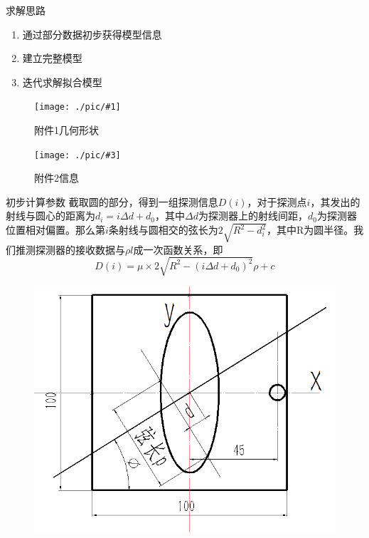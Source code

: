 \documentclass{beamer}
\newcommand{\doublepic}[4]{ \begin{figure}[H]
\begin{minipage}[H]{0.45\textwidth}
\centering
\texttt{[image: ./pic/\#1]}
\caption{#2}
\end{minipage}
\begin{minipage}[H]{0.45\textwidth}
\centering
\texttt{[image: ./pic/\#3]}
\caption{#4}
\end{minipage}
\end{figure}}
\begin{document}
\begin{frame}{求解思路}
	\begin{enumerate}
		\item 通过部分数据初步获得模型信息
		\item 建立完整模型
		\item 迭代求解拟合模型
	\end{enumerate}
	\doublepic{fujian1.png}{附件1几何形状}{fujian2.png}{附件2信息}
\end{frame}

\begin{frame}{初步计算参数}
	\small 截取圆的部分，得到一组探测信息\(D(i)\)，对于探测点\(i\)，其发出的射线与圆心的距离为\(d_i = i\Delta d + d_0\)，其中\(\Delta d\)为探测器上的射线间距，\(d_0\)为探测器位置相对偏置。那么第\(i\)条射线与圆相交的弦长为\(2\sqrt{R^2 - d_i^2}\)，其中R为圆半径。我们推测探测器的接收数据与\(\rho l\)成一次函数关系，即
	\begin{equation}
		D(i)  = \mu\times 2\sqrt{R^2 - ( i\Delta d + d_0)^2}\rho  +c
	\end{equation}
	\begin{figure}[H]
		\begin{minipage}[H]{0.45\textwidth}
		\centering
		\includegraphics[width=\textwidth]{./pic/q10.png}
		\end{minipage}
		\begin{minipage}[H]{0.45\textwidth}
		\centering

\end{minipage}
\end{figure}
\end{frame}
\end{document}
